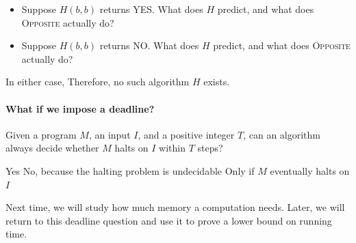 \documentclass[11  pt]{article}
\begin{document}
\begin{itemize}
    \item Suppose $H(b,b)$ returns YES. What does $H$ predict, and what does \textsc{Opposite} actually do?
    \vs{2cm}
    \item Suppose $H(b,b)$ returns NO. What does $H$ predict, and what does \textsc{Opposite} actually do?
    \vs{2cm}
\end{itemize}

In either case,  Therefore, no such algorithm $H$ exists.

\paragraph{What if we impose a deadline?}
\begin{Qu}
    Given a program $M$, an input $I$, and a positive integer $T$, can an algorithm always decide whether $M$ halts on $I$ within $T$ steps?
    \begin{itemize}
        \aitem Yes
        \bitem No, because the halting problem is undecidable
        \citem Only if $M$ eventually halts on $I$
    \end{itemize}
\end{Qu}

\vfill
Next time, we will study how much memory a computation needs. Later, we will return to this deadline question and use it to prove a lower bound on running time.
\end{document}
